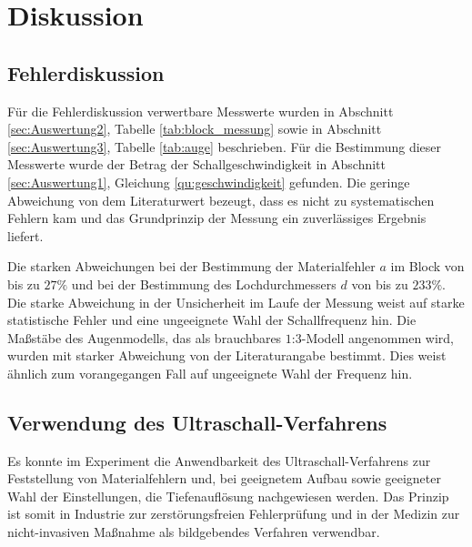\section{Diskussion}
\label{sec:Diskussion}

\subsection{Fehlerdiskussion}
Für die Fehlerdiskussion verwertbare Messwerte wurden in Abschnitt \ref{sec:Auswertung2}, Tabelle \ref{tab:block_messung} sowie in Abschnitt \ref{sec:Auswertung3}, Tabelle \ref{tab:auge} beschrieben.
Für die Bestimmung dieser Messwerte wurde der Betrag der Schallgeschwindigkeit in Abschnitt \ref{sec:Auswertung1}, Gleichung \eqref{qu:geschwindigkeit} gefunden.
Die geringe Abweichung von dem Literaturwert bezeugt, dass es nicht zu systematischen Fehlern kam und das Grundprinzip der Messung ein zuverlässiges Ergebnis liefert.

Die starken Abweichungen bei der Bestimmung der Materialfehler $a$ im Block von bis zu $27\%$ und 
bei der Bestimmung des Lochdurchmessers $d$ von bis zu $233\%$.
Die starke Abweichung in der Unsicherheit im Laufe der Messung weist auf starke statistische Fehler und eine ungeeignete Wahl der Schallfrequenz hin. 
Die Maßstäbe des Augenmodells, das als brauchbares $1$:$3$-Modell angenommen wird, wurden mit starker Abweichung von der Literaturangabe bestimmt.
Dies weist ähnlich zum vorangegangen Fall auf ungeeignete Wahl der Frequenz hin.

\subsection{Verwendung des Ultraschall-Verfahrens}
Es konnte im Experiment die Anwendbarkeit des Ultraschall-Verfahrens zur Feststellung von Materialfehlern und, bei geeignetem Aufbau sowie geeigneter Wahl der Einstellungen, die Tiefenauflösung nachgewiesen werden.
Das Prinzip ist somit in Industrie zur zerstörungsfreien Fehlerprüfung und in der Medizin zur nicht-invasiven Maßnahme als bildgebendes Verfahren verwendbar.